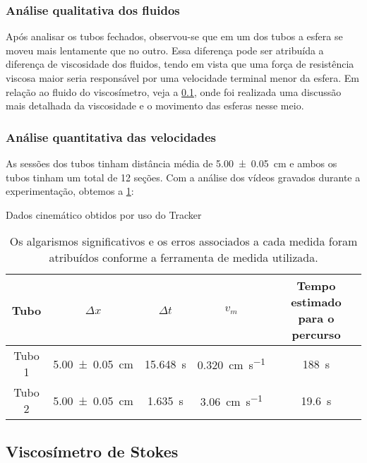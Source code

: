 \subsubsection{Análise qualitativa dos fluidos}
    Após analisar os tubos fechados, observou-se que em um dos tubos a esfera se
    moveu mais lentamente que no outro. Essa diferença pode ser atribuída a
    diferença de viscosidade dos fluidos, tendo em vista que uma força de
    resistência viscosa maior seria responsável por uma velocidade terminal
    menor da esfera. Em relação ao fluido do viscosímetro, veja
    a \cref{sec:viscStokes}, onde foi realizada uma discussão mais
    detalhada da viscosidade e o movimento das esferas nesse meio.

\subsubsection{Análise quantitativa das velocidades}
    As sessões dos tubos tinham distância média de
    \qty{5.00\pm0.05}{\centi\meter} e ambos os tubos tinham um total de 12
    seções. Com a análise dos vídeos gravados durante a experimentação, obtemos
    a \cref{tab:tubos}:
    \begin{table}[H]
    \caption{Dados cinemático obtidos por uso do
    Tracker\textsuperscript{\textcopyright}}\label{tab:tubos}
    \begin{center}
    \begin{tabular}{c c c c c}
    \hline
    Tubo & \( \Delta x \) & \( \Delta t \) & \( v_m \) & Tempo estimado para o
    percurso \\
    \hline
    Tubo 1 & \qty{5.00\pm0.05}{\centi\meter} & \qty{15.648}{\second} &
    \qty{0.320}{\centi\meter\per\second} & \qty{188}{\second} \\
    Tubo 2 & \qty{5.00\pm0.05}{\centi\meter} & \qty{1.635}{\second} &
    \qty{3.06}{\centi\meter\per\second} & \qty{19.6}{\second} \\
    \hline
    \end{tabular}
    \end{center}
    \caption*{Os algarismos significativos e os erros associados a cada medida
    foram atribuídos conforme a ferramenta de medida utilizada.}
    \end{table}

\subsection{Viscosímetro de Stokes}\label{sec:viscStokes}
